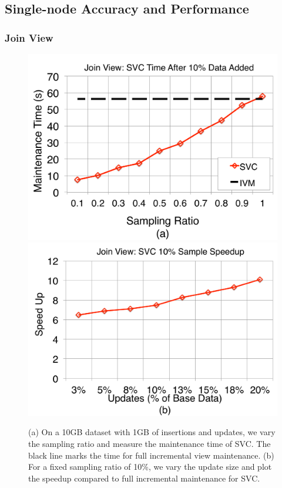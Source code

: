 \subsection{Single-node Accuracy and Performance}

\subsubsection{Join View}

\begin{figure}[t]
\centering
\includegraphics[scale=0.15]{exp/msj_1.pdf}
\includegraphics[scale=0.15]{exp/msj_2.pdf}
 \caption{(a) On a 10GB dataset with 1GB of insertions and updates, we vary the sampling ratio and measure the maintenance time of SVC. The black line marks the time for full incremental view maintenance. (b) For a fixed sampling ratio of 10\%, we vary the update size and plot the speedup compared to full incremental maintenance for SVC. \label{exp-1-samplesize}}
\end{figure}

